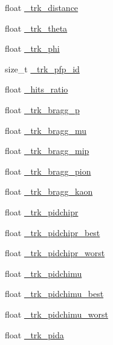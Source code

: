 \begin{DoxyCompactItemize}
float \hyperlink{classselection_1_1NuMuSelection_a4d2e1ceec2811a4493f964212b744e26}{\+\_\+trk\+\_\+distance}
\item 
float \hyperlink{classselection_1_1NuMuSelection_a2041fd7980c1dbe98ce5a4c77a305167}{\+\_\+trk\+\_\+theta}
\item 
float \hyperlink{classselection_1_1NuMuSelection_aeb0b180b3bbe753b576c4db2fa3f94af}{\+\_\+trk\+\_\+phi}
\item 
size\+\_\+t \hyperlink{classselection_1_1NuMuSelection_acbc163e95eec5a3bbbf3648480737a56}{\+\_\+trk\+\_\+pfp\+\_\+id}
\item 
float \hyperlink{classselection_1_1NuMuSelection_a550c6e1bb4c959af5f5724b122b39999}{\+\_\+hits\+\_\+ratio}
\item 
float \hyperlink{classselection_1_1NuMuSelection_a14e0373dc5bdb3b21399f45b7313294c}{\+\_\+trk\+\_\+bragg\+\_\+p}
\item 
float \hyperlink{classselection_1_1NuMuSelection_a51cf3e575038967284eb7ff10eeba9e0}{\+\_\+trk\+\_\+bragg\+\_\+mu}
\item 
float \hyperlink{classselection_1_1NuMuSelection_acf6657ef58eba53a46c0a8c9057ff170}{\+\_\+trk\+\_\+bragg\+\_\+mip}
\item 
float \hyperlink{classselection_1_1NuMuSelection_ae68f8cd5aba5ad848ac6ef0576ce6039}{\+\_\+trk\+\_\+bragg\+\_\+pion}
\item 
float \hyperlink{classselection_1_1NuMuSelection_a8fb54244ae254a42f6238bca2d7fb34e}{\+\_\+trk\+\_\+bragg\+\_\+kaon}
\item 
float \hyperlink{classselection_1_1NuMuSelection_af65eea94c4d2811de82693751684131d}{\+\_\+trk\+\_\+pidchipr}
\item 
float \hyperlink{classselection_1_1NuMuSelection_ad0b2f58434040e2c9e9304a93252d5e1}{\+\_\+trk\+\_\+pidchipr\+\_\+best}
\item 
float \hyperlink{classselection_1_1NuMuSelection_a0373f32c36b713af9febf4e5e3b6899a}{\+\_\+trk\+\_\+pidchipr\+\_\+worst}
\item 
float \hyperlink{classselection_1_1NuMuSelection_a3ae2c291adeedd490d43b915257553f7}{\+\_\+trk\+\_\+pidchimu}
\item 
float \hyperlink{classselection_1_1NuMuSelection_a5bdc83ae76241b73654f99768ea43ffb}{\+\_\+trk\+\_\+pidchimu\+\_\+best}
\item 
float \hyperlink{classselection_1_1NuMuSelection_ad1761cb4833e688d27f6f95321156136}{\+\_\+trk\+\_\+pidchimu\+\_\+worst}
\item 
float \hyperlink{classselection_1_1NuMuSelection_ae2b400954b0bce9930437be4fdb7fd85}{\+\_\+trk\+\_\+pida}

\end{DoxyCompactItemize}
